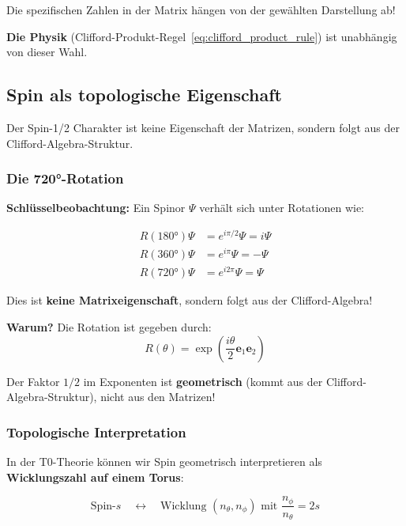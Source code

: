 Die spezifischen Zahlen in der Matrix hängen von der gewählten Darstellung ab!

\textbf{Die Physik} (Clifford-Produkt-Regel~\eqref{eq:clifford_product_rule}) ist 
unabhängig von dieser Wahl.

\subsection{Spin als topologische Eigenschaft}
\label{subsec:spin_topology_detailed}

Der Spin-1/2 Charakter ist keine Eigenschaft der Matrizen, sondern folgt aus der 
Clifford-Algebra-Struktur.

\subsubsection{Die 720°-Rotation}

\textbf{Schlüsselbeobachtung:} Ein Spinor $\Psi$ verhält sich unter Rotationen wie:

\begin{align}
	R(180°) \Psi &= e^{i\pi/2} \Psi = i \Psi \\
	R(360°) \Psi &= e^{i\pi} \Psi = -\Psi \\
	R(720°) \Psi &= e^{i 2\pi} \Psi = \Psi
\end{align}

Dies ist \textbf{keine Matrixeigenschaft}, sondern folgt aus der Clifford-Algebra!

\textbf{Warum?} Die Rotation ist gegeben durch:
\begin{equation}
	R(\theta) = \exp\left(\frac{i\theta}{2} \mathbf{e}_1 \mathbf{e}_2\right)
\end{equation}

Der Faktor $1/2$ im Exponenten ist \textbf{geometrisch} (kommt aus der 
Clifford-Algebra-Struktur), nicht aus den Matrizen!

\subsubsection{Topologische Interpretation}

In der T0-Theorie können wir Spin geometrisch interpretieren als 
\textbf{Wicklungszahl auf einem Torus}:

\begin{equation}
	\text{Spin-}s \quad \longleftrightarrow \quad \text{Wicklung } (n_\theta, n_\phi) 
	\text{ mit } \frac{n_\phi}{n_\theta} = 2s
	\label{eq:spin_winding_number}
\end{equation}

